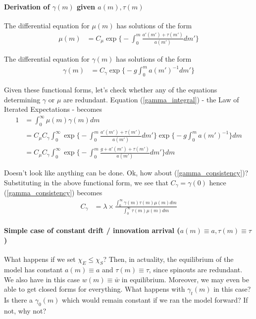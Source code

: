 \documentclass[12pt,english]{article}
\theoremstyle{remark}
\begin{document}
\paragraph{Derivation of $\gamma(m)$ given $a(m),\tau(m)$}
The differential equation for $\mu(m)$ has solutions of the form
\begin{align*}
	\mu(m) &= C_{\mu}\exp\Bigg\{ - \int_0^m \frac{a'(m') + \tau(m')}{a(m')} dm'\Bigg\}
\end{align*}

The differential equation for $\gamma(m)$ has solutions of the form
\begin{align*}
	\gamma(m) &= C_{\gamma} \exp\Bigg\{ -g \int_0^m a(m')^{-1} dm' \Bigg\}
\end{align*}

Given these functional forms, let's check whether any of the equations determining $\gamma$ or $\mu$ are redundant. Equation (\ref{gamma_integral}) - the Law of Iterated Expectations - becomes
\begin{align*}
	1 &= \int_{0}^{\infty} \mu(m) \gamma(m) dm \\
	  &= C_{\mu} C_{\gamma} \int_0^{\infty} \exp\Big\{ - \int_0^m \frac{a'(m') + \tau(m')}{a(m')} dm' \Big\} \exp\Big\{ -g \int_{0}^{m} a(m')^{-1}  \Big\} dm \\
	  &= C_{\mu} C_{\gamma} \int_0^{\infty} \exp\Big\{ - \int_0^m \frac{g + a'(m') + \tau(m')}{a(m')} dm' \Big\} dm
\end{align*}

Doesn't look like anything can be done. Ok, how about (\ref{gamma_consistency})? Substituting in the above functional form, we see that $C_{\gamma} = \gamma(0)$ hence (\ref{gamma_consistency}) becomes
\begin{align*}
	C_{\gamma} &=  \lambda \times \frac{\int_{0}^{\infty} \gamma(m) \tau(m) \mu(m) dm}{\int_{0}^{\infty}\tau(m) \mu(m) dm}
\end{align*}

\paragraph{Simple case of constant drift / innovation arrival ($a(m) \equiv a, \tau(m) \equiv \tau$)}

What happens if we set $\chi_E \le \chi_S$? Then, in actuality, the equilibrium of the model has constant $a(m) \equiv a$ and $\tau(m) \equiv \tau$, since spinouts are redundant. We also have in this case $w(m) \equiv \bar{w}$ in equilibrium. Moreover, we may even be able to get closed forms for everything. What happens with $\gamma_t(m)$ in this case? Is there a $\gamma_0(m)$ which would remain constant if we ran the model forward? If not, why not?
\end{document}
